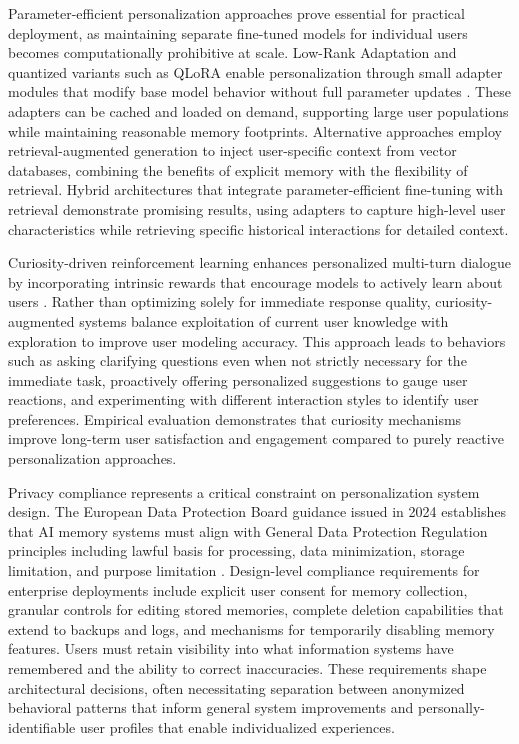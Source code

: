Parameter-efficient personalization approaches prove essential for practical deployment, as maintaining separate fine-tuned models for individual users becomes computationally prohibitive at scale. Low-Rank Adaptation and quantized variants such as QLoRA enable personalization through small adapter modules that modify base model behavior without full parameter updates \citep{together2024finetune}. These adapters can be cached and loaded on demand, supporting large user populations while maintaining reasonable memory footprints. Alternative approaches employ retrieval-augmented generation to inject user-specific context from vector databases, combining the benefits of explicit memory with the flexibility of retrieval. Hybrid architectures that integrate parameter-efficient fine-tuning with retrieval demonstrate promising results, using adapters to capture high-level user characteristics while retrieving specific historical interactions for detailed context.

Curiosity-driven reinforcement learning enhances personalized multi-turn dialogue by incorporating intrinsic rewards that encourage models to actively learn about users \citep{zhang2024curiosity}. Rather than optimizing solely for immediate response quality, curiosity-augmented systems balance exploitation of current user knowledge with exploration to improve user modeling accuracy. This approach leads to behaviors such as asking clarifying questions even when not strictly necessary for the immediate task, proactively offering personalized suggestions to gauge user reactions, and experimenting with different interaction styles to identify user preferences. Empirical evaluation demonstrates that curiosity mechanisms improve long-term user satisfaction and engagement compared to purely reactive personalization approaches.

Privacy compliance represents a critical constraint on personalization system design. The European Data Protection Board guidance issued in 2024 establishes that AI memory systems must align with General Data Protection Regulation principles including lawful basis for processing, data minimization, storage limitation, and purpose limitation \citep{edpb2024guidance}. Design-level compliance requirements for enterprise deployments include explicit user consent for memory collection, granular controls for editing stored memories, complete deletion capabilities that extend to backups and logs, and mechanisms for temporarily disabling memory features. Users must retain visibility into what information systems have remembered and the ability to correct inaccuracies. These requirements shape architectural decisions, often necessitating separation between anonymized behavioral patterns that inform general system improvements and personally-identifiable user profiles that enable individualized experiences.

